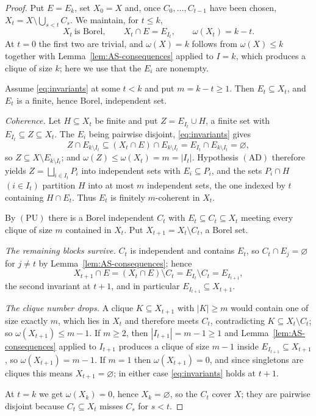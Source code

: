 \documentclass[11pt,reqno]{amsart}
\theoremstyle{plain}
\theoremstyle{definition}
\theoremstyle{remark}
\newcommand{\cl}{\omega}
\begin{document}
\begin{proof}
Put $E=E_{k}$, set $X_0=X$ and, once $C_0,\dots,C_{t-1}$ have been chosen,
$X_t=X\setminus\bigcup_{s<t}C_s$. We maintain, for $t\le k$,
\begin{equation*}
X_t\ \text{is Borel},
\qquad
X_t\cap E=E_{I_t},
\qquad
\cl(X_t)=k-t.
\tag{$\ast_t$}
\label{eq:invariants}
\end{equation*}
At $t=0$ the first two are trivial, and $\cl(X)=k$ follows from $\cl(X)\le k$
together with Lemma~\ref{lem:AS-consequences} applied to $I=k$, which
produces a clique of size $k$; here we use that the $E_i$ are nonempty.

Assume \eqref{eq:invariants} at some $t<k$ and put $m=k-t\ge1$. Then
$E_t\subseteq X_t$, and $E_t$ is a finite, hence Borel, independent set.

\emph{Coherence.} Let $H\subseteq X_t$ be finite and put $Z=E_{I_t}\cup H$, a
finite set with $E_{I_t}\subseteq Z\subseteq X_t$. The $E_i$ being pairwise
disjoint, \eqref{eq:invariants} gives
\[
Z\cap E_{k\setminus I_t}\subseteq(X_t\cap E)\cap E_{k\setminus I_t}
=E_{I_t}\cap E_{k\setminus I_t}=\varnothing,
\]
so $Z\subseteq X\setminus E_{k\setminus I_t}$; and
$\cl(Z)\le\cl(X_t)=m=|I_t|$. Hypothesis $\mathrm{(AD)}$ therefore yields
$Z=\bigsqcup_{i\in I_t}P_i$ into independent sets with $E_i\subseteq P_i$, and
the sets $P_i\cap H$ $(i\in I_t)$ partition $H$ into at most $m$ independent
sets, the one indexed by $t$ containing $H\cap E_t$. Thus $E_t$ is finitely
$m$-coherent in $X_t$.

By $\mathrm{(PU)}$ there is a Borel independent $C_t$ with
$E_t\subseteq C_t\subseteq X_t$ meeting every clique of size $m$ contained in
$X_t$. Put $X_{t+1}=X_t\setminus C_t$, a Borel set.

\emph{The remaining blocks survive.} $C_t$ is independent and contains $E_t$,
so $C_t\cap E_j=\varnothing$ for $j\neq t$ by
Lemma~\ref{lem:AS-consequences}; hence
\[
X_{t+1}\cap E=(X_t\cap E)\setminus C_t=E_{I_t}\setminus C_t=E_{I_{t+1}},
\]
the second invariant at $t+1$, and in particular
$E_{I_{t+1}}\subseteq X_{t+1}$.

\emph{The clique number drops.} A clique $K\subseteq X_{t+1}$ with $|K|\ge m$
would contain one of size exactly $m$, which lies in $X_t$ and therefore meets
$C_t$, contradicting $K\subseteq X_t\setminus C_t$; so $\cl(X_{t+1})\le m-1$.
If $m\ge2$, then $|I_{t+1}|=m-1\ge1$ and Lemma~\ref{lem:AS-consequences}
applied to $I_{t+1}$ produces a clique of size $m-1$ inside
$E_{I_{t+1}}\subseteq X_{t+1}$, so $\cl(X_{t+1})=m-1$. If $m=1$ then
$\cl(X_{t+1})=0$, and since singletons are cliques this means
$X_{t+1}=\varnothing$; in either case \eqref{eq:invariants} holds at $t+1$.

At $t=k$ we get $\cl(X_k)=0$, hence $X_k=\varnothing$, so the $C_t$ cover $X$;
they are pairwise disjoint because $C_t\subseteq X_t$ misses $C_s$ for $s<t$.
\end{proof}
\end{document}

